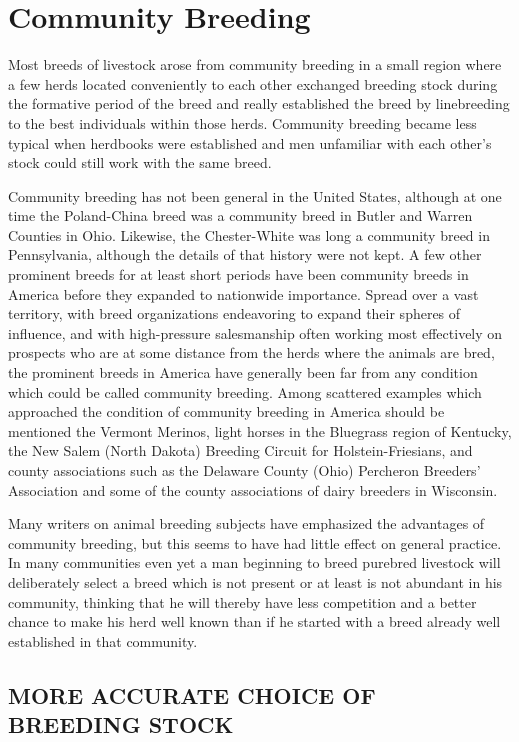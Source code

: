 \chapter{Community Breeding}
\label{cha:Lush_Chapter_33}

Most breeds of livestock arose from community breeding in a small
region where a few herds located conveniently to each other exchanged
breeding stock during the formative period of the breed and really
established the breed by linebreeding to the best individuals within
those herds. Community breeding became less typical when herdbooks
were established and men unfamiliar with each other's stock could still
work with the same breed.

Community breeding has not been general in the United States,
although at one time the Poland-China breed was a community breed
in Butler and Warren Counties in Ohio. Likewise, the Chester-White
was long a community breed in Pennsylvania, although the details of
that history were not kept. A few other prominent breeds for at least
short periods have been community breeds in America before they
expanded to nationwide importance. Spread over a vast territory, with
breed organizations endeavoring to expand their spheres of influence,
and with high-pressure salesmanship often working most effectively on
prospects who are at some distance from the herds where the animals
are bred, the prominent breeds in America have generally been far from
any condition which could be called community breeding. Among scattered
examples which approached the condition of community breeding
in America should be mentioned the Vermont Merinos, light horses
in the Bluegrass region of Kentucky, the New Salem (North Dakota)
Breeding Circuit for Holstein-Friesians, and county associations such as
the Delaware County (Ohio) Percheron Breeders' Association and some
of the county associations of dairy breeders in Wisconsin.

Many writers on animal breeding subjects have emphasized the
advantages of community breeding, but this seems to have had little
effect on general practice. In many communities even yet a man beginning
to breed purebred livestock will deliberately select a breed which
is not present or at least is not abundant in his community, thinking
that he will thereby have less competition and a better chance to make
his herd well known than if he started with a breed already well
established in that community.

\section*{MORE ACCURATE CHOICE OF BREEDING STOCK}

